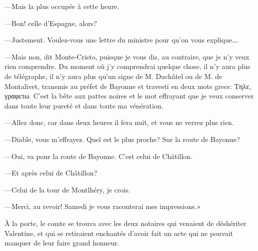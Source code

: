 —Mais la plus occupée à cette heure. 

—Bon! celle d'Espagne, alors?  

—Justement. Voulez-vous une lettre du ministre pour qu'on vous explique\dots. 

—Mais non, dit Monte-Cristo, puisque je vous dis, au contraire, que je n'y veux rien comprendre. Du moment où j'y comprendrai quelque chose, il n'y aura plus de télégraphe, il n'y aura plus qu'un signe de M. Duchâtel ou de M. de Montalivet, transmis au préfet de Bayonne et travesti en deux mots grecs: Τηλε, γραφετω. C'est la bête aux pattes noires et le mot effrayant que je veux conserver dans toute leur pureté et dans toute ma vénération. 

—Allez donc, car dans deux heures il fera nuit, et vous ne verrez plus rien. 

—Diable, vous m'effrayez. Quel est le plus proche? Sur la route de Bayonne? 

—Oui, va pour la route de Bayonne. C'est celui de Châtillon. 

—Et après celui de Châtillon? 

—Celui de la tour de Montlhéry, je crois. 

—Merci, au revoir! Samedi je vous raconterai mes impressions.» 

À la porte, le comte se trouva avec les deux notaires qui venaient de déshériter Valentine, et qui se retiraient enchantés d'avoir fait un acte qui ne pouvait manquer de leur faire grand honneur.  